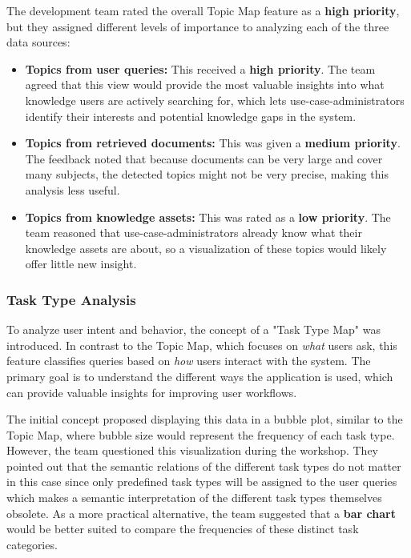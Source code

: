 \documentclass[
	english,
	ruledheaders=section,%
	class=report,%
	thesis={type=bachelor},%
	accentcolor=1b,%
	custommargins=true,%
	marginpar=false,%
	parskip=half-,%
	fontsize=11pt,%
	DIV=14,
]{tudapub}
\begin{document}
The development team rated the overall Topic Map feature as a \textbf{high priority}, but they assigned different levels of importance to analyzing each of the three data sources:

\begin{itemize}
    \item \textbf{Topics from user queries:} This received a \textbf{high priority}. The team agreed that this view would provide the most valuable insights into what knowledge users are actively searching for, which lets use-case-administrators identify their interests and potential knowledge gaps in the system.
    
    \item \textbf{Topics from retrieved documents:} This was given a \textbf{medium priority}. The feedback noted that because documents can be very large and cover many subjects, the detected topics might not be very precise, making this analysis less useful.
    
    \item \textbf{Topics from knowledge assets:} This was rated as a \textbf{low priority}. The team reasoned that use-case-administrators already know what their knowledge assets are about, so a visualization of these topics would likely offer little new insight.
\end{itemize}
\subsubsection{Task Type Analysis}
To analyze user intent and behavior, the concept of a "Task Type Map" was introduced. In contrast to the Topic Map, which focuses on \textit{what} users ask, this feature classifies queries based on \textit{how} users interact with the system. The primary goal is to understand the different ways the application is used, which can provide valuable insights for improving user workflows.

The initial concept proposed displaying this data in a bubble plot, similar to the Topic Map, where bubble size would represent the frequency of each task type. However, the team questioned this visualization during the workshop. They pointed out that the semantic relations of the different task types do not matter in this case since only predefined task types will be assigned to the user queries which makes a semantic interpretation of the different task types themselves obsolete. As a more practical alternative, the team suggested that a \textbf{bar chart} would be better suited to compare the frequencies of these distinct task categories.
\end{document}
